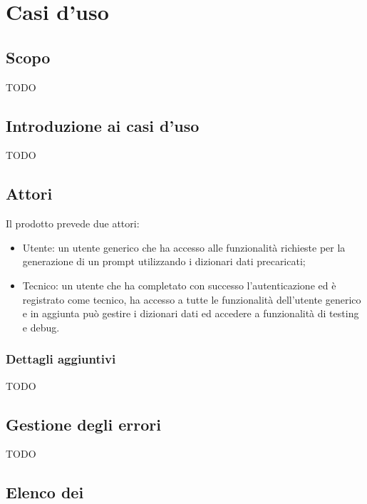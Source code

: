 \section{Casi d'uso}

\subsection{Scopo}
TODO
\subsection{Introduzione ai casi d'uso}
TODO

\subsection{Attori}
Il prodotto prevede due attori:
\begin{itemize}
  \item Utente: un utente generico che ha accesso alle funzionalità richieste per la generazione di un prompt utilizzando i dizionari dati precaricati;
  \item Tecnico: un utente che ha completato con successo l'autenticazione ed è registrato come tecnico, ha accesso a tutte le funzionalità dell'utente generico e in aggiunta può gestire i dizionari dati ed accedere a funzionalità di testing e debug.
\end{itemize}

\subsubsection{Dettagli aggiuntivi}
TODO

\subsection{Gestione degli errori}
TODO

\subsection{Elenco dei }



















